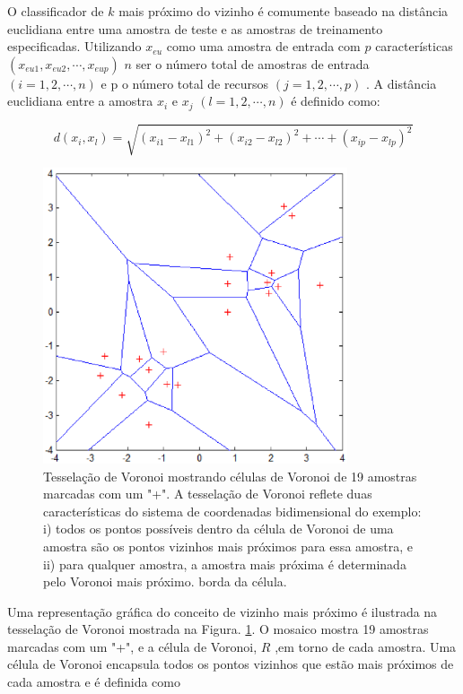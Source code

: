 O classificador de $ k $ mais próximo do vizinho é comumente baseado na distância euclidiana entre uma amostra de teste e as amostras de treinamento especificadas. Utilizando $ x_{eu} $ como uma amostra de entrada com $ p $ características $ (x_{eu1},x_{eu2},\cdots ,x_{eup}) $ $ n $ ser o número total de amostras de entrada $ (i=1,2,\cdots,n) $ e p o número total de recursos $ (j=1,2,\cdots,p) $ . A distância euclidiana entre a amostra $ x_{i} $ e $ x_{j} $ $ (l=1,2,\cdots,n) $  é definido como:

\begin{equation} \label{eq:diseuclidiana}
    d(x_{i},x_{l})=\sqrt{(x_{i1}-x_{l1})^{2}+(x_{i2}-x_{l2})^{2}+\cdots+(x_{ip}-x_{lp})^{2}}
\end{equation}


\begin{figure}[!htb]
    \centering
    \includegraphics[width=0.8\textwidth]{figuras/Knn_voronoi.eps}
    \caption{Tesselação de Voronoi mostrando células de Voronoi de 19 amostras marcadas com um "+". A tesselação de Voronoi reflete duas características do sistema de coordenadas bidimensional do exemplo: i) todos os pontos possíveis dentro da célula de Voronoi de uma amostra são os pontos vizinhos mais próximos para essa amostra, e ii) para qualquer amostra, a amostra mais próxima é determinada pelo Voronoi mais próximo. borda da célula.}
    \label{voronoiEx}
\end{figure}

Uma representação gráfica do conceito de vizinho mais próximo é ilustrada na tesselação de Voronoi \cite{voronoi1907g} mostrada na Figura. \ref{voronoiEx}. O mosaico mostra 19 amostras marcadas com um "+", e a célula de Voronoi, $ R $ ,em torno de cada amostra. Uma célula de Voronoi encapsula todos os pontos vizinhos que estão mais próximos de cada amostra e é definida como

